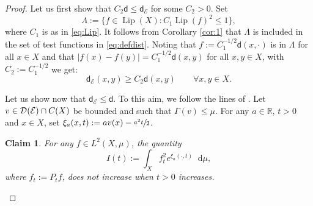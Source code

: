 \documentclass[10pt]{amsart}
\let\sep:
\newcommand{\NoChangel}[1]{%
\expandafter\let\csname old\string#1\endcsname=#1
\let#1=\relax
\newcommand{#1}{\mathcode`l="716C\csname old\string#1\endcsname\mathcode`l="7160 }%
}
\theoremstyle{plain}
\newtheorem{claim}[theorem]{Claim}
\theoremstyle{definition}
\newcommand{\setR}{\mathbb{R}}
\newcommand{\cE}{\mathcal{E}}
\newcommand{\cD}{\mathcal{D}}
\newcommand{\di}{\mathop{}\!\mathrm{d}}
\newcommand{\loc}{\mathrm{loc}}\NoChangel{\loc}
\DeclareMathOperator{\Lip}{Lip}
\newcommand{\dist}{\mathsf{d}}
\begin{document}
\begin{proof}
Let us first show that $C_2\dist \le \dist_\cE$ for some $C_2>0$. Set
\[
\Lambda:=\{f \in \Lip(X) \sep C_1\Lip(f)^2 \le 1\},
\]
where $C_1$ is as in \eqref{eq:Lip}. It follows from Corollary \ref{cor:1} that $\Lambda$ is included in the set of test functions in \eqref{eq:defdist}. Noting that $f:=C_1^{-1/2}\dist(x,\cdot)$ is in $\Lambda$ for all $x \in X$ and that $|f(x)-f(y)|=C_1^{-1/2}\dist(x,y)$ for all $x,y \in X$, with $C_2:=C_1^{-1/2}$ we get:
\[
\dist_\cE(x,y)\ge C_2\dist(x,y) \qquad \forall x,y \in X.
\]

Let us show now that $\dist_\cE \le \dist$. To this aim, we follow the lines of \cite{Grigor'yanEd}. Let $v \in \cD_{\loc}(\cE)\cap C(X)$ be bounded and such that $\Gamma(v)\le \mu$. For any $a \in \setR$, $t>0$ and $x \in X$, set $\xi_a(x,t):=a v(x) - \sfrac{a^2t}{2}$.

\begin{claim}
For any $f \in L^2(X,\mu)$, the quantity
\[
I(t):=\int_X f_t^2 e^{\xi_a(\cdot,t)} \di \mu,
\]
where $f_t:=P_t f$, does not increase when $t>0$ increases.
\end{claim}


\end{proof}
\end{document}
